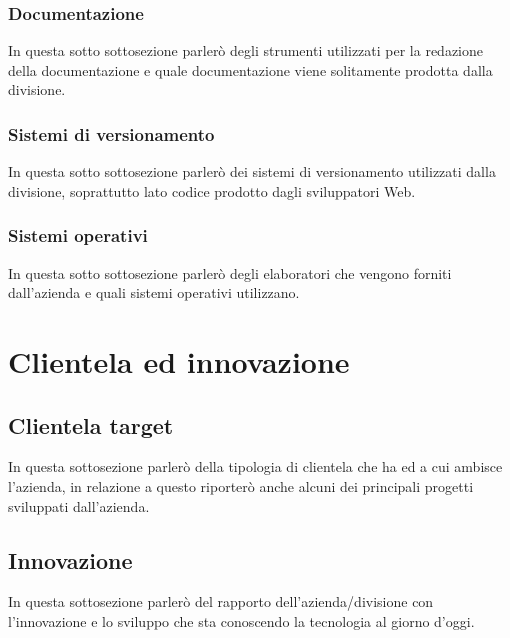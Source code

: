 \subsubsection{Documentazione}
In questa sotto sottosezione parlerò degli strumenti utilizzati per la redazione della documentazione e quale documentazione viene solitamente prodotta dalla divisione.

\subsubsection{Sistemi di versionamento}
In questa sotto sottosezione parlerò dei sistemi di versionamento utilizzati dalla divisione, soprattutto lato codice prodotto dagli sviluppatori Web.

\subsubsection{Sistemi operativi}
In questa sotto sottosezione parlerò degli elaboratori che vengono forniti dall'azienda e quali sistemi operativi utilizzano.

\section{Clientela ed innovazione}

\subsection{Clientela target}
In questa sottosezione parlerò della tipologia di clientela che ha ed a cui ambisce l'azienda, in relazione a questo riporterò anche alcuni dei principali progetti sviluppati dall'azienda.

\subsection{Innovazione}
In questa sottosezione parlerò del rapporto dell'azienda/divisione con l'innovazione e lo sviluppo che sta conoscendo la tecnologia al giorno d'oggi.
